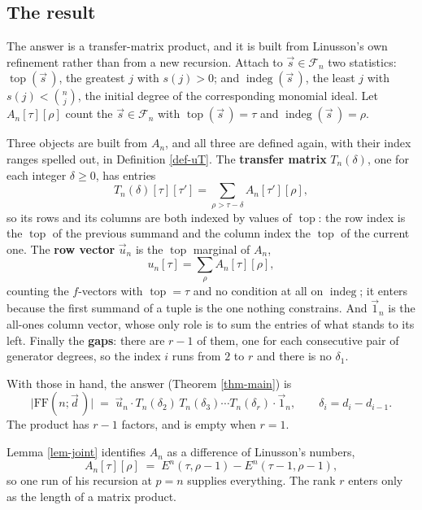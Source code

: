 \documentclass[11pt, a4paper, abstract=yes]{scrartcl}
\theoremstyle{definition}
\theoremstyle{remark}
\theoremstyle{plain}
\newcommand{\indeg}{\operatorname{indeg}}
\newcommand{\tp}{\operatorname{top}}
\begin{document}
\subsection{The result}
\label{sec:org222f823}

The answer is a transfer-matrix product, and it is built from Linusson's own refinement rather than
from a new recursion. Attach to \(\vec s\in\mathcal F_n\) two statistics: \(\tp(\vec s\,)\), the greatest \(j\)
with \(s(j)>0\); and \(\indeg(\vec s\,)\), the least \(j\) with \(s(j)<\binom nj\), the initial degree
of the corresponding monomial ideal. Let \(A_n[\tau][\rho]\) count the \(\vec s\in\mathcal F_n\) with
\(\tp(\vec s\,)=\tau\) and \(\indeg(\vec s\,)=\rho\).

Three objects are built from \(A_n\), and all three are defined again, with their index ranges spelled
out, in Definition \ref{def-uT}. The \textbf{transfer matrix} \(T_n(\delta)\), one for each integer
\(\delta\ge0\), has entries
\begin{equation}\label{eq:intro-T}
  T_n(\delta)[\tau][\tau']=\sum_{\rho>\tau-\delta}A_n[\tau'][\rho] ,
\end{equation}
so its rows and its columns are both indexed by values of \(\tp\): the row index is the \(\tp\) of
the previous summand and the column index the \(\tp\) of the current one. The \textbf{row vector}
\(\vec u_n\) is the \(\tp\) marginal of \(A_n\),
\begin{equation}\label{eq:intro-u}
  u_n[\tau]=\sum_{\rho}A_n[\tau][\rho] ,
\end{equation}
counting the \(f\)-vectors with \(\tp=\tau\) and no condition at all on \(\indeg\); it enters because
the first summand of a tuple is the one nothing constrains. And \(\vec 1_n\) is the all-ones column
vector, whose only role is to sum the entries of what stands to its left. Finally the \textbf{gaps}: there
are \(r-1\) of them, one for each consecutive pair of generator degrees, so the index \(i\) runs from
\(2\) to \(r\) and there is no \(\delta_1\).

With those in hand, the answer (Theorem \ref{thm-main}) is
\begin{equation}\label{eq:auto-3}
  \lvert\mathrm{FF}(n;\vec d\,)\rvert\;=\;\vec u_n\cdot T_n(\delta_2)\,T_n(\delta_3)\cdots T_n(\delta_r)\cdot\vec 1_n,
  \qquad \delta_i=d_i-d_{i-1} .
\end{equation}
The product has \(r-1\) factors, and is empty when \(r=1\).

Lemma \ref{lem-joint} identifies \(A_n\) as a difference of Linusson's numbers,
\begin{equation}\label{eq:auto-4}
  A_n[\tau][\rho]\;=\;E^n(\tau,\rho-1)-E^n(\tau-1,\rho-1),
\end{equation}
so one run of his recursion at \(p=n\) supplies everything. The rank \(r\) enters only as the length
of a matrix product.
\end{document}
